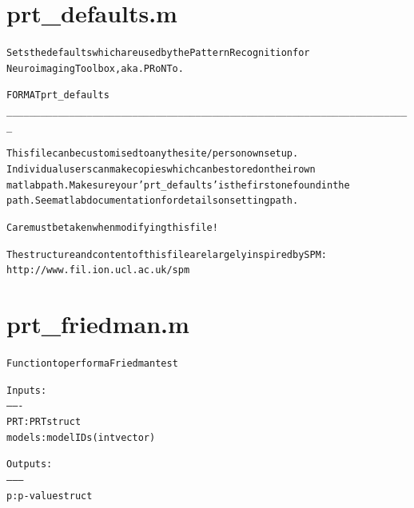 \section{prt\_defaults.m}
\begin{alltt}

 Sets the defaults which are used by the Pattern Recognition for
 Neuroimaging Toolbox, aka. PRoNTo.
 
 FORMAT prt\_defaults
\_\_\_\_\_\_\_\_\_\_\_\_\_\_\_\_\_\_\_\_\_\_\_\_\_\_\_\_\_\_\_\_\_\_\_\_\_\_\_\_\_\_\_\_\_\_\_\_\_\_\_\_\_\_\_\_\_\_\_\_\_\_\_\_\_\_\_\_\_\_\_
 
 This file can be customised to any the site/person own setup.
 Individual users can make copies which can be stored on their own
 matlab path. Make sure your 'prt\_defaults' is the first one found in the
 path. See matlab documentation for details on setting path.
 
 Care must be taken when modifying this file!
 
 The structure and content of this file are largely inspired by SPM:
 http://www.fil.ion.ucl.ac.uk/spm
\end{alltt}


\section{prt\_friedman.m}
\begin{alltt}

 Function to perform a Friedman test
 
 Inputs:
 -------
 PRT:     PRT struct
 models:  model IDs (int vector)
 
 Outputs:
 --------
 p:       p-value struct
 
\end{alltt}


